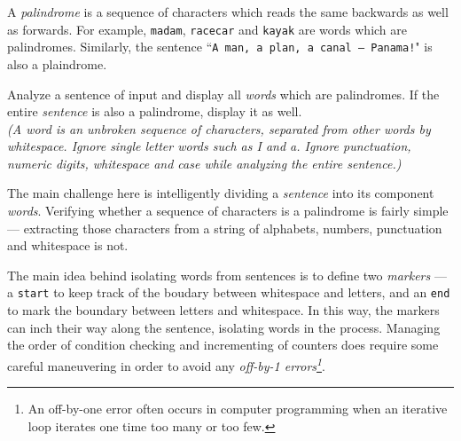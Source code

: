 

\problem A {\em palindrome} is a sequence of characters which reads the same backwards as well as forwards.
For example, {\tt madam}, {\tt racecar} and {\tt kayak} are words which are palindromes. Similarly, the sentence ``{\tt A man, a plan, a canal -- Panama!}" is also a plaindrome.

Analyze a sentence of input and display all {\em words} which are palindromes. If the entire {\em sentence} is also a palindrome, display it as well.\\

{\em (A word is an unbroken sequence of characters, separated from other words by whitespace. Ignore single letter words such as {\em I} and {\em a}.
Ignore punctuation, numeric digits, whitespace and case while analyzing the entire sentence.)}

\solution The main challenge here is intelligently dividing a {\em sentence} into its component {\em words}. Verifying whether a sequence of characters is a palindrome is fairly simple --- extracting those characters from a string of alphabets, numbers, punctuation and whitespace is not.

The main idea behind isolating words from sentences is to define two {\em markers} --- a {\tt start} to keep track of the boudary between whitespace and letters, and an {\tt end} to mark the boundary between letters and whitespace. In this way, the markers can inch their way along the sentence, isolating words in the process. Managing the order of condition checking and incrementing of counters does require some careful maneuvering in order to avoid any {\em off-by-1 errors\footnote{An off-by-one error often occurs in computer programming when an iterative loop iterates one time too many or too few.}}.

\sourcecode
